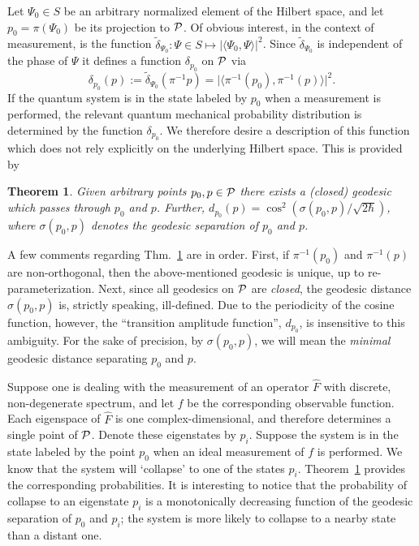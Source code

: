 \documentclass[12pt,aps,eqsecnum,tighten,nofootinbib]{revtex4-2}
\newtheorem{theorem}{Theorem}[section]
\def\be{\begin{equation}}
\def\ee{\end{equation}}
\def\<{\langle}
\def\>{\rangle}
\def\P{{\cal P}}
\begin{document}
Let $\Psi_0 \in S$ be an arbitrary normalized element of the Hilbert
space, and let $p_0 = \pi(\Psi_0)$ be its projection to $\P$. Of
obvious interest, in the context of measurement, is the function
$\tilde{\delta}_{\Psi_0} :\Psi\in S \mapsto \big| \< \Psi_0 , \Psi \>
\big|^2$.  Since $\tilde{\delta}_{\Psi_0}$ is independent of the phase of
$\Psi$ it defines a function $\delta_{p_0}$ on $\P$ via
%
\be
\delta_{p_0}(p) := \tilde{\delta}_{\Psi_0} ( \pi^{-1}p )
= \big| \< \pi^{-1}(p_0),  \pi^{-1}(p) \> \big|^2.
\ee
%
If the quantum system is in the state labeled by $p_0$ when a
measurement is performed, the relevant quantum mechanical probability
distribution is determined by the function $\delta_{p_0}$.  We
therefore desire a description of this function which does not rely
explicitly on the underlying Hilbert space.  This is provided by
%
\begin{theorem}\label{thm_geodesics}
Given arbitrary points $p_0, p \in \P$ there exists a (closed)
geodesic which passes through $p_0$ and $p$. Further, $d_{p_0}(p) =
\cos^2\left( \sigma(p_0, p) / \sqrt{2\hbar} \right)$, where
$\sigma(p_0, p)$ denotes the geodesic separation of $p_0$ and $p$.
\end{theorem}

A few comments regarding Thm.~\ref{thm_geodesics} are in order.
First, if $\pi^{-1}(p_0)$ and $\pi^{-1}(p)$ are non-orthogonal, then
the above-mentioned geodesic is unique, up to re-parameterization.
Next, since all geodesics on $\P$ are {\em closed}, the geodesic
distance $\sigma(p_0, p)$ is, strictly speaking, ill-defined.  Due to
the periodicity of the cosine function, however, the ``transition
amplitude function'', $d_{p_0}$, is insensitive to this ambiguity.
For the sake of precision, by $\sigma(p_0, p)$, we will mean the {\em
minimal} geodesic distance separating $p_0$ and $p$.

Suppose one is dealing with the measurement of an operator $\hat{F}$
with discrete, non-degenerate spectrum, and let $f$ be the
corresponding observable function.  Each eigenspace of $\hat{F}$ is
one complex-dimensional, and therefore determines a single point of
 $\P$.  Denote these eigenstates by $p_i$.  Suppose the system is in
the state labeled by the point $p_0$ when an ideal measurement of $f$
is performed.  We know that the system will `collapse' to one of the
states $p_i$.  Theorem~\ref{thm_geodesics} provides the corresponding
probabilities.  It is interesting to notice that the probability of
collapse to an eigenstate $p_i$ is a monotonically decreasing function
of the geodesic separation of $p_0$ and $p_i$; the system is more
likely to collapse to a nearby state than a distant one.
\end{document}
